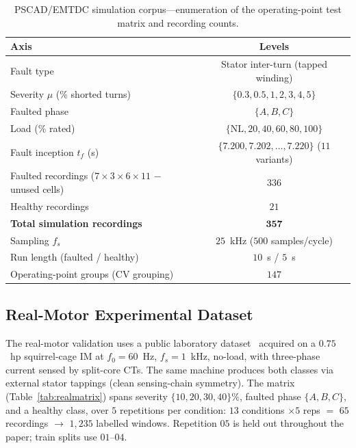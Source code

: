 \documentclass[journal]{IEEEtran}
\begin{document}
\begin{table}[!t]
\caption{PSCAD/EMTDC simulation corpus---enumeration of the operating-point test matrix and
recording counts.}
\label{tab:simmatrix}
\centering
\footnotesize
\begin{tabular}{@{}lc@{}}
\toprule
Axis & Levels  \\
\midrule
Fault type & Stator inter-turn (tapped winding) \\
Severity $\mu$ (\% shorted turns) & $\{0.3, 0.5, 1, 2, 3, 4, 5\}$ \\
Faulted phase & $\{A, B, C\}$ \\
Load (\% rated) & $\{\mathrm{NL}, 20, 40, 60, 80, 100\}$ \\
Fault inception $t_f$ (s) & $\{7.200, 7.202, \dots, 7.220\}$ ($11$ variants) \\
\midrule
Faulted recordings ($7 \!\times\! 3 \!\times\! 6 \!\times\! 11$ $-$ unused cells) & $336$ \\
Healthy recordings & $21$ \\
\textbf{Total simulation recordings} & $\mathbf{357}$ \\
\midrule
Sampling $f_s$ & $25$~kHz ($500$ samples/cycle) \\
Run length (faulted / healthy) & $10$~s / $5$~s \\
Operating-point groups (CV grouping) & $147$ \\
\bottomrule
\end{tabular}
\end{table}

\subsection{Real-Motor Experimental Dataset}
\label{sec:realset}
The real-motor validation uses a public laboratory dataset~\cite{ibarram} acquired on a
$0.75$~hp squirrel-cage IM at $f_0 = 60$~Hz, $f_s = 1$~kHz, no-load, with three-phase
current sensed by split-core CTs. The same machine produces both classes via external
stator tappings (clean sensing-chain symmetry). The matrix (Table~\ref{tab:realmatrix})
spans severity $\{10, 20, 30, 40\}\%$, faulted phase $\{A, B, C\}$, and a healthy class,
over $5$ repetitions per condition: $13$ conditions $\times 5$ reps $=$ $65$ recordings
$\rightarrow$ $1{,}235$ labelled windows. Repetition $05$ is held out throughout the
paper; train splits use $01$--$04$.
\end{document}
